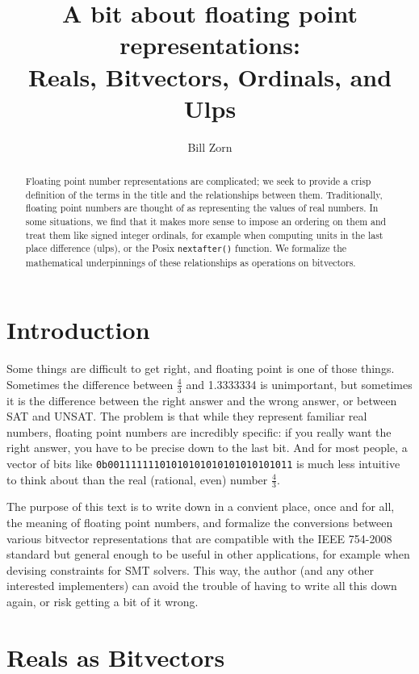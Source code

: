 \documentclass[letterpaper,10pt]{article}
\title{A bit about floating point representations: \\ Reals, Bitvectors, Ordinals, and Ulps}
\author{Bill Zorn}
\begin{document}
\maketitle

\begin{abstract}
 Floating point number representations are complicated; we seek to provide a crisp definition of the terms in the title and the relationships between them. Traditionally, floating point numbers are thought of as representing the values of real numbers. In some situations, we find that it makes more sense to impose an ordering on them and treat them like signed integer ordinals, for example when computing units in the last place difference (ulps), or the Posix \texttt{nextafter()} function. We formalize the mathematical underpinnings of these relationships as operations on bitvectors.
\end{abstract}

\section{Introduction}

Some things are difficult to get right, and floating point is one of those things. Sometimes the difference between $\frac{4}{3}$ and 1.3333334 is unimportant, but sometimes it is the difference between the right answer and the wrong answer, or between SAT and UNSAT. The problem is that while they represent familiar real numbers, floating point numbers are incredibly specific: if you really want the right answer, you have to be precise down to the last bit. And for most people, a vector of bits like \texttt{0b00111111101010101010101010101011} is much less intuitive to think about than the real (rational, even) number $\frac{4}{3}$.

The purpose of this text is to write down in a convient place, once and for all, the meaning of floating point numbers, and formalize the conversions between various bitvector representations that are compatible with the IEEE 754-2008 standard \cite{ieee754-2008} but general enough to be useful in other applications, for example when devising constraints for SMT solvers. This way, the author (and any other interested implementers) can avoid the trouble of having to write all this down again, or risk getting a bit of it wrong.

\section{Reals as Bitvectors}
\end{document}
